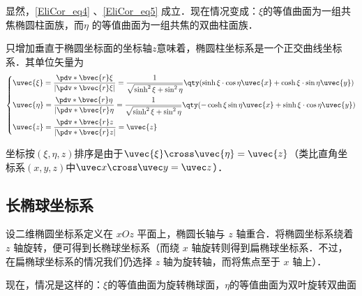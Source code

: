 显然，\autoref{EliCor_eq4} 、\autoref{EliCor_eq5} 成立．现在情况变成：$\xi$的等值曲面为一组共焦椭圆柱面族，而$\eta$ 的等值曲面为一组共焦的双曲柱面族．

只增加垂直于椭圆坐标面的坐标轴$z$意味着，椭圆柱坐标系是一个正交曲线坐标系．其单位矢量为
\begin{equation}
\left\{
    \begin{aligned}
    &\uvec{\xi}=\frac{\pdv*{\bvec{r}}{\xi}}{|\pdv*{\bvec{r}}{\xi}|}=\frac{1}{\sqrt{\sinh^2\xi+\sin^2\eta}}\qty(\sinh\xi\cdot\cos\eta\uvec{x}+\cosh\xi\cdot\sin\eta\uvec{y})\\
    &\uvec{\eta }=\frac{\pdv*{\bvec{r}}{\eta}}{|\pdv*{\bvec{r}}{\eta}}=\frac{1}{\sqrt{\sinh^2\xi+\sin^2\eta}}\qty(-\cosh\xi\sin\eta\uvec{x}+\sinh\xi\cdot\cos\eta\uvec{y})\\
    &\uvec{z}=\frac{\pdv*{\bvec{r}}{z}}{|\pdv*{\bvec{r}}{z}|}=\uvec{z}
    \end{aligned}\right.
\end{equation}

坐标按$(\xi,\eta,z)$排序是由于$\uvec{\xi}\cross\uvec{\eta}=\uvec{z}$（类比直角坐标系$(x,y,z)$中$\uvec x\cross\uvec y=\uvec z$）．
\subsection{长椭球坐标系}
设二维椭圆坐标系定义在 $xOz$ 平面上，椭圆长轴与 $z$ 轴重合．将椭圆坐标系绕着 $z$ 轴旋转，便可得到长椭球坐标系（而绕 $x$ 轴旋转则得到扁椭球坐标系．不过，在扁椭球坐标系的情况我们仍选择 $z$ 轴为旋转轴，而将焦点至于 $x$ 轴上）．

现在，情况是这样的：$\xi$的等值曲面为旋转椭球面，$\eta$的等值曲面为双叶旋转双曲面


